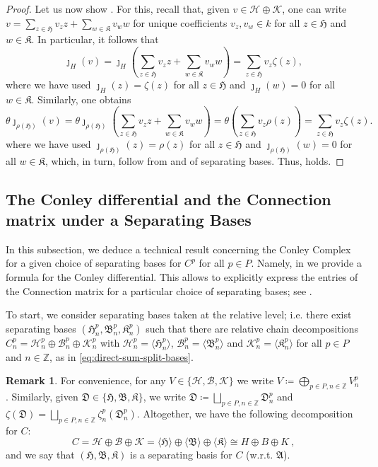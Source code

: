 \documentclass[11pt, table, nothms]{amsart}
\theoremstyle{definition}
\newtheorem{remark}[theorem]{Remark}
\newcommand{\B}{\mathcal{B}}
\newcommand{\Z}{\mathbb{Z}}
\newcommand{\cK}{\mathcal{K}}
\newcommand{\cH}{\mathcal{H}}
\newcommand{\fA}{\mathfrak{A}}
\newcommand{\fB}{\mathfrak{B}}
\newcommand{\fD}{\mathfrak{D}}
\newcommand{\fH}{\mathfrak{H}}
\newcommand{\fK}{\mathfrak{K}}
\begin{document}
{\begin{proof}
    Let us now show .
    For this, recall that, given $v \in \cH\oplus \cK$, one can write 
    $v=\sum_{z \in \fH}v_z z + \sum_{w \in \fK}v_w w$ for unique coefficients $v_z,v_w \in k$ for all $z \in \fH$ and $w \in \fK$.
    In particular, it follows that
    \[
    \jmath_{H}(v) = 
    \jmath_{H}\left( \sum_{z \in \fH}v_z z + \sum_{w \in \fK}v_w w\right) =
    \sum_{z \in \fH}v_z \zeta(z),
    \]
    where we have used $\jmath_{H}(z)=\zeta(z)$ for all $z \in \fH$ and $\jmath_{H}(w)=0$ for all $w \in \fK$.
    Similarly, one obtains 
    \[
    \theta\jmath_{\rho(\fH)}(v) = 
    \theta\jmath_{\rho(\fH)}\left( \sum_{z \in \fH}v_z z + \sum_{w \in \fK}v_w w\right) =
    \theta\left( \sum_{z \in \fH}v_z \rho(z)\right) =
    \sum_{z \in \fH}v_z \zeta(z).
    \]
    where we have used $\jmath_{\rho(\fH)}(z)=\rho(z)$ for all $z \in \fH$ and $\jmath_{\rho(\fH)}(w)=0$ for all $w \in \fK$, which, in turn, follow from  and  of separating bases.
    Thus,  holds.
\end{proof}

\subsection{The Conley differential and the Connection matrix under a Separating Bases}\label{subsec:conley_formulae}

In this subsection, we deduce a technical result concerning the Conley Complex for a given choice of separating bases for $C^p$ for all $p\in P$. 
Namely, in  we provide a formula for the Conley differential. 
This allows to explicitly express the entries of the Connection matrix for a particular choice of separating bases; see .

To start, we consider separating bases taken at the relative level; i.e. there exist separating bases $(\fH^p_n, \fB^p_n, \fK^p_n)$ such that there are relative chain decompositions  $C^p_n=\cH^p_n\oplus \B^p_n \oplus \cK^p_n$ with $\cH^p_n=\langle \fH^p_n\rangle$, $\B^p_n=\langle \fB^p_n\rangle$ and $\cK^p_n=\langle \fK^p_n\rangle$ for all $p \in P$ and $n\in \Z$, as in \cref{eq:direct-sum-split-bases}.

\begin{remark}\label{rmk:notation_2}
    For convenience, for any $V \in \{ \cH, \B, \cK\}$ we write $V\coloneqq\bigoplus_{p\in P, n\in \Z} V^p_n$.
    Similarly, given $\fD \in \{ \fH, \fB, \fK\}$, we write $\fD\coloneqq \bigsqcup_{p \in P, n\in \Z} \fD_n^p$ and 
    $\zeta(\fD) = \bigsqcup_{p \in P, n\in \Z} \zeta^p_n(\fD_n^p)$.
    Altogether, we have the following decomposition for $C$:
    \[
        C = \cH \oplus \B \oplus \cK = \langle\fH\rangle \oplus \langle \fB \rangle \oplus \langle \fK \rangle \cong H \oplus B \oplus K\ ,
    \]
    and we say that $(\fH, \fB, \fK)$ is a separating basis for $C$ (w.r.t. $\fA$). 
\end{remark}

}
\end{document}
